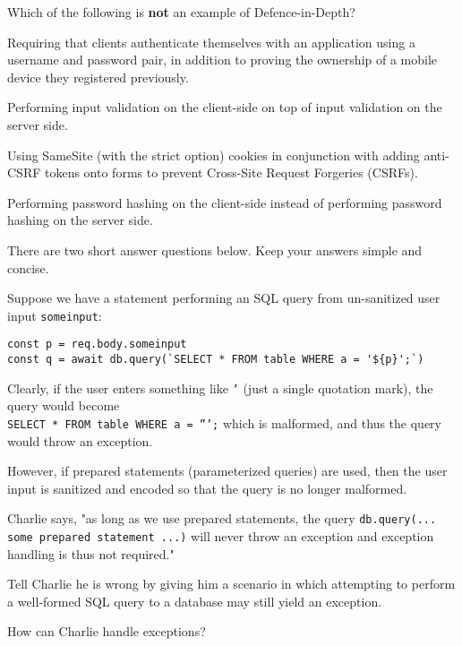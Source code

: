 \documentclass[exam,qn]{yqteach}
\begin{document}
 Which of the following is \textbf{not} an example of Defence-in-Depth?
\begin{letteroptions}
    \item Requiring that clients authenticate themselves with an application using a username and password pair, in addition to proving the ownership of a mobile device they registered previously.
    \item Performing input validation on the client-side on top of input validation on the server side.
    \item Using SameSite (with the strict option) cookies in conjunction with adding anti-CSRF tokens onto forms to prevent Cross-Site Request Forgeries (CSRFs).
    \item Performing password hashing on the client-side instead of performing password hashing on the server side.
\end{letteroptions}

There are two short answer questions below. Keep your answers simple and concise.

 Suppose we have a statement performing an SQL query from un-sanitized user input \texttt{someinput}:

\begin{verbatim}
const p = req.body.someinput
const q = await db.query(`SELECT * FROM table WHERE a = '${p}';`)
\end{verbatim}
Clearly, if the user enters something like \texttt{'} (just a single quotation mark), the query would become\\
\texttt{SELECT * FROM table WHERE a = ''';} which is malformed, and thus the query would throw an exception.

However, if prepared statements (parameterized queries) are used, then the user input is sanitized and encoded so that the query is no longer malformed.

Charlie says, "as long as we use prepared statements, the query \texttt{db.query(... some prepared statement ...)} will never throw an exception and exception handling is thus not required."

 Tell Charlie he is wrong by giving him a scenario in which attempting to perform a well-formed SQL query to a database may still yield an exception.

 How can Charlie handle exceptions?


\endofdocument
\end{document}
